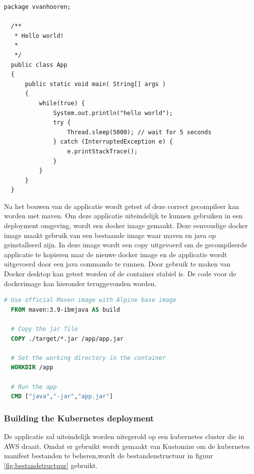 \begin{lstlisting}
package vvanhooren;

  /**
   * Hello world!
   *
   */
  public class App 
  {
      public static void main( String[] args )
      {
          while(true) {
              System.out.println("hello world");
              try {
                  Thread.sleep(5000); // wait for 5 seconds
              } catch (InterruptedException e) {
                  e.printStackTrace();
              }
          }
      }
  }
\end{lstlisting}
\vspace{4cm}
Na het bouwen van de applicatie wordt getest of deze correct gecompileer kan worden met maven. Om deze applicatie uiteindelijk te kunnen gebruiken in een deployment omgeving, wordt een docker image gemaakt. Deze eenvoudige docker image maakt gebruik van een bestaande image waar maven en java op geinstalleerd zijn. In deze image wordt een copy uitgevoerd om de gecompileerde applicatie te kopieren naar de nieuwe docker image en de applicatie wordt uitgevoerd door een java commando te runnen. Door gebruik te maken van Docker desktop kan getest worden of de container stabiel is. De code voor de dockerimage kan hieronder teruggevonden worden.
\newline

\begin{lstlisting}[style=dockerfile,language=Dockerfile]
  # Use official Maven image with Alpine base image
  FROM maven:3.9-ibmjava AS build
  
  # Copy the jar file 
  COPY ./target/*.jar /app/app.jar
  
  # Set the working directory in the container
  WORKDIR /app
  
  # Run the app
  CMD ["java","-jar","app.jar"]
\end{lstlisting}

\subsubsection{
{Building the Kubernetes deployment}}
\label{sec:Bouwen van de Kubernetes deployment}

De applicatie zal uiteindelijk worden uitegerold op een kubernetes cluster die in AWS draait. Omdat er gebruikt wordt gemaakt van Kustomize om de kubernetes manifest bestanden te beheren,wordt de bestandenstructuur in figuur \ref{fig:bestandstructuur} gebruikt.
\newline

